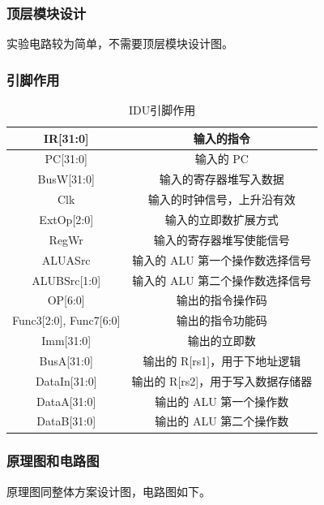 \documentclass{article}
\begin{document}
    \subsubsection{顶层模块设计}
    实验电路较为简单，不需要顶层模块设计图。

    \subsubsection{引脚作用}
    \begin{table}[H]
    \centering
    \begin{tabular}{|c|c|}
        \hline
        IR[31:0]      & 输入的指令 \\ \hline
        PC[31:0]    & 输入的 PC \\ \hline
        BusW[31:0]  & 输入的寄存器堆写入数据 \\ \hline
        Clk  & 输入的时钟信号，上升沿有效 \\ \hline
        ExtOp[2:0]  & 输入的立即数扩展方式 \\ \hline
        RegWr & 输入的寄存器堆写使能信号 \\ \hline
        ALUASrc & 输入的 ALU 第一个操作数选择信号 \\ \hline
        ALUBSrc[1:0]  & 输入的 ALU 第二个操作数选择信号 \\ \hline
        OP[6:0]  & 输出的指令操作码 \\ \hline
        Func3[2:0], Func7[6:0] & 输出的指令功能码   \\ \hline
        Imm[31:0] & 输出的立即数 \\ \hline
        BusA[31:0] & 输出的 R[rs1]，用于下地址逻辑 \\ \hline
        DataIn[31:0] & 输出的 R[rs2]，用于写入数据存储器 \\ \hline
        DataA[31:0] & 输出的 ALU 第一个操作数 \\ \hline
        DataB[31:0]  & 输出的 ALU 第二个操作数 \\ \hline
    \end{tabular}
    \caption{IDU引脚作用}
    \end{table}
    
    \subsubsection{原理图和电路图}
    原理图同整体方案设计图，电路图如下。
\end{document}
